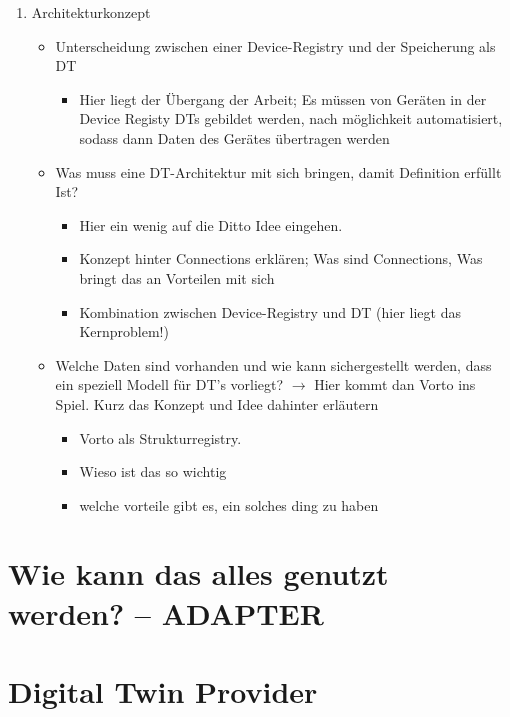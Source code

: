 \begin{enumerate}
    \item Architekturkonzept
    \begin{itemize}
        \item Unterscheidung zwischen einer Device-Registry und der Speicherung als DT
        \begin{itemize}
            \item Hier liegt der Übergang der Arbeit; Es müssen von Geräten in der Device Registy DTs gebildet werden, nach möglichkeit automatisiert, sodass dann Daten des Gerätes übertragen werden
        \end{itemize}
        \item Was muss eine DT-Architektur mit sich bringen, damit Definition erfüllt Ist?
        \begin{itemize}
            \item Hier ein wenig auf die Ditto Idee eingehen.
            \item Konzept hinter Connections erklären; Was sind Connections, Was bringt das an Vorteilen mit sich
            \item Kombination zwischen Device-Registry und DT (hier liegt das Kernproblem!)
        \end{itemize}
        \item Welche Daten sind vorhanden und wie kann sichergestellt werden, dass ein speziell Modell für DT's vorliegt? $\rightarrow$ Hier kommt dan Vorto ins Spiel. Kurz das Konzept und Idee dahinter erläutern
        \begin{itemize}
            \item Vorto als Strukturregistry.
            \item Wieso ist das so wichtig
            \item welche vorteile gibt es, ein solches ding zu haben
        \end{itemize}
    \end{itemize}
\end{enumerate}

\section{Wie kann das alles genutzt werden? -- ADAPTER}

\section{Digital Twin Provider}

